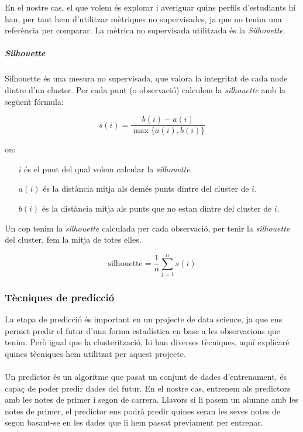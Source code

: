 \documentclass[12pt,a4paper,catalan]{article}
\begin{document}
En el nostre cas, el que volem és explorar i averiguar quins perfils d'estudiants hi han, per tant hem d'utilitzar mètriques no supervisades, ja que no tenim una referència per comparar. La mètrica no supervisada utilitzada és la \textit{Silhouette}.

\subparagraph{\textit{Silhouette}}
Silhouette \cite{silhouette} és una mesura no supervisada, que valora la integritat de cada node dintre d'un cluster. Per cada punt (o observació) calculem la \textit{silhouette} amb la següent fórmula:

$$ s(i) = \frac{b(i) - a(i)}{\max\{a(i),b(i)\}} $$

on:
\begin{itemize}[leftmargin=.5in]
	\item [$i$] és el punt del qual volem calcular la \textit{silhouette}.
	\item [$a(i)$] és la distància mitja als demés punts dintre del cluster de $i$.
	\item [$b(i)$] és la distància mitja als punts que no estan dintre del cluster de $i$.
\end{itemize}

Un cop tenim la \textit{silhouette} calculada per cada observació, per tenir la \textit{silhouette} del cluster, fem la mitja de totes elles.

$$ \mathrm{silhouette} = \frac{1}{n} \sum_{j=1}^n s(i) $$

\newpage


\subsubsection{Tècniques de predicció}
\label{subsec:predictors}
La etapa de predicció és important en un projecte de data science, ja que ens permet predir el futur d'una forma estadística en base a les observacions que tenim. Però igual que la clusterització, hi han diverses tècniques, aquí explicaré quines tècniques hem utilitzat per aquest projecte.
\\
\\
Un predictor és un algoritme que pasat un conjunt de dades d'entrenament, és capaç de poder predir dades del futur. En el nostre cas, entrenem als predictors amb les notes de primer i segon de carrera. Llavors si li pasem un alumne amb les notes de primer, el predictor ens podrà predir quines seran les seves notes de segon basant-se en les dades que li hem passat previament per entrenar.
\end{document}
